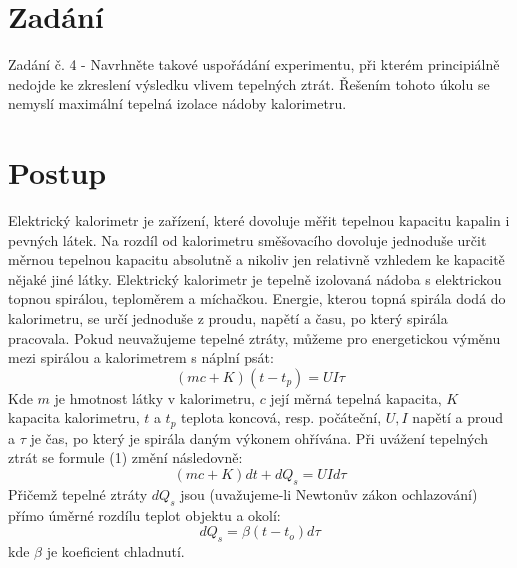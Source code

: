 \documentclass[czech,11pt,a4paper]{article}
\begin{document}
	
	\section{Zadání}
	Zadání č. 4 - Navrhněte takové uspořádání experimentu, při kterém principiálně nedojde ke zkreslení výsledku vlivem tepelných ztrát. Řešením tohoto úkolu se nemyslí maximální tepelná izolace nádoby kalorimetru.
	
	\section{Postup}
	Elektrický kalorimetr je zařízení, které dovoluje měřit tepelnou kapacitu kapalin i pevných látek. Na rozdíl od kalorimetru směšovacího dovoluje jednoduše určit měrnou tepelnou kapacitu
	absolutně a nikoliv jen relativně vzhledem ke kapacitě nějaké jiné látky.
	Elektrický kalorimetr je tepelně izolovaná nádoba s elektrickou topnou spirálou, teploměrem a
	míchačkou. Energie, kterou topná spirála dodá do kalorimetru, se určí jednoduše z proudu, napětí
	a času, po který spirála pracovala. Pokud neuvažujeme tepelné ztráty, můžeme pro energetickou
	výměnu mezi spirálou a kalorimetrem s náplní psát:
	\begin{equation}
		(mc + K)(t-t_p) = UI \tau
	\end{equation}
	Kde $m$ je hmotnost látky v kalorimetru, $c$ její měrná tepelná kapacita, $K$ kapacita kalorimetru, $t$ a $t_p$ teplota koncová, resp. počáteční, $U, I$ napětí a proud a $\tau$ je čas, po který je spirála daným výkonem ohřívána.
	Při uvážení tepelných ztrát se formule (1) změní následovně:
	\begin{equation}
		(mc + K)dt + dQ_s = UI d\tau
	\end{equation}
	Přičemž tepelné ztráty $dQ_s$ jsou (uvažujeme-li Newtonův zákon ochlazování) přímo úměrné rozdílu teplot objektu a okolí:
	\begin{equation}
		dQ_s = \beta (t-t_o)d\tau
	\end{equation}
	kde $\beta $ je koeficient chladnutí.
\end{document}
